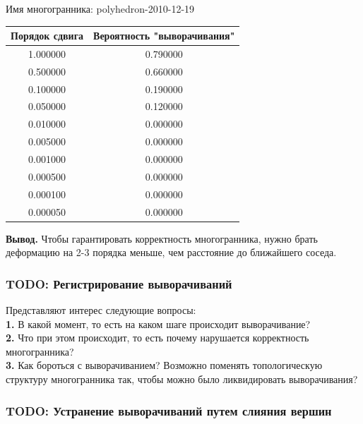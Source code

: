 \documentclass[a4paper,12pt, titlepage]{article}
\begin{document}
\begin{flushleft}
Имя многогранника: polyhedron-2010-12-19\\
\begin{tabular}{|c|c|}
\hline
	Порядок сдвига & Вероятность "выворачивания"\\
\hline
	1.000000 &	0.790000\\
\hline
	0.500000 &	0.660000\\
\hline
	0.100000 &	0.190000\\
\hline
	0.050000 &	0.120000\\
\hline
	0.010000 &	0.000000\\
\hline
	0.005000 &	0.000000\\
\hline
	0.001000 &	0.000000\\
\hline
	0.000500 &	0.000000\\
\hline
	0.000100 &	0.000000\\
\hline
	0.000050 &	0.000000\\
\hline
\end{tabular}
\end{flushleft}

\begin{flushleft}
 \textbf{Вывод. }Чтобы гарантировать корректность многогранника, нужно брать деформацию на 2-3 порядка меньше, чем 
расстояние до ближайшего соседа.
\end{flushleft}

\subsubsection{TODO: Регистрирование выворачиваний}
\begin{flushleft}
 Представляют интерес следующие вопросы:\\
\textbf{1.} В какой момент, то есть на каком шаге происходит выворачивание?\\
\textbf{2.} Что при этом происходит, то есть почему нарушается корректность многогранника?\\
\textbf{3.} Как бороться с выворачиванием? Возможно поменять топологическую структуру многогранника так,
чтобы можно было ликвидировать выворачивания?
\end{flushleft}

\subsubsection{TODO: Устранение выворачиваний путем слияния вершин}
\end{document}
